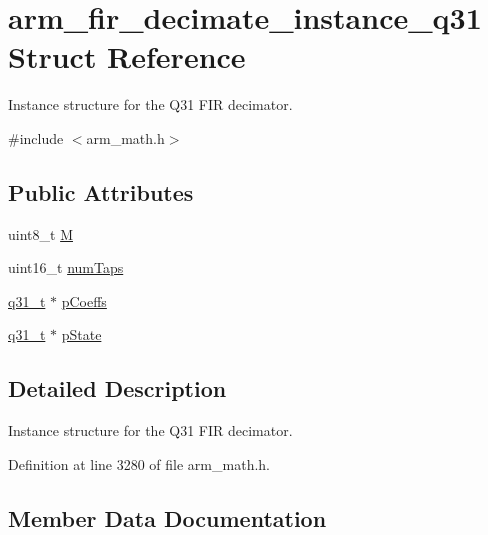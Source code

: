 \hypertarget{structarm__fir__decimate__instance__q31}{}\section{arm\+\_\+fir\+\_\+decimate\+\_\+instance\+\_\+q31 Struct Reference}
\label{structarm__fir__decimate__instance__q31}


Instance structure for the Q31 F\+IR decimator.  




{\ttfamily \#include $<$arm\+\_\+math.\+h$>$}

\subsection*{Public Attributes}
\begin{DoxyCompactItemize}
\item 
uint8\+\_\+t \hyperlink{structarm__fir__decimate__instance__q31_ad3d6936c36303b30dd38f1eddf248ae5}{M}
\item 
uint16\+\_\+t \hyperlink{structarm__fir__decimate__instance__q31_a37915d42b0dc5e3057ebe83110798482}{num\+Taps}
\item 
\hyperlink{arm__math_8h_adc89a3547f5324b7b3b95adec3806bc0}{q31\+\_\+t} $\ast$ \hyperlink{structarm__fir__decimate__instance__q31_a030d0391538c2481c5b348fd09a952ff}{p\+Coeffs}
\item 
\hyperlink{arm__math_8h_adc89a3547f5324b7b3b95adec3806bc0}{q31\+\_\+t} $\ast$ \hyperlink{structarm__fir__decimate__instance__q31_a0ef0ef9e265f7ab873cfc6daa7593fdb}{p\+State}
\end{DoxyCompactItemize}


\subsection{Detailed Description}
Instance structure for the Q31 F\+IR decimator. 

Definition at line 3280 of file arm\+\_\+math.\+h.



\subsection{Member Data Documentation}
\mbox{\label{structarm__fir__decimate__instance__q31_ad3d6936c36303b30dd38f1eddf248ae5}} 
